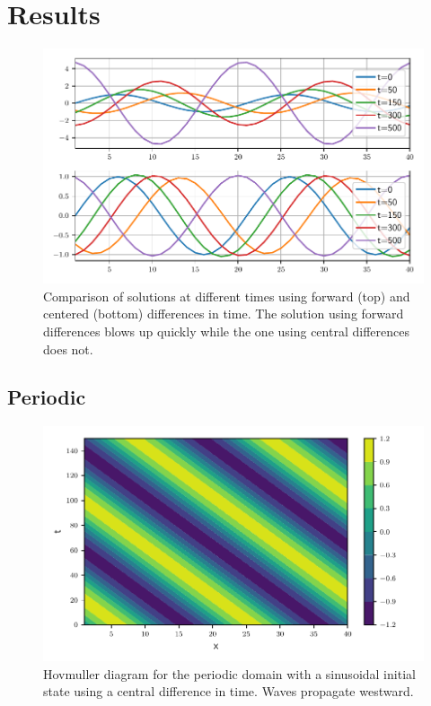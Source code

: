 \section{Results}


\begin{figure}[htp]
  \centering
  \includegraphics[width=\textwidth]{../figures/compare_dt_1.pdf}
  \caption{Comparison of solutions at different times using forward (top) and
  centered (bottom) differences in time. The solution using forward differences
  blows up quickly while the one using central differences does not.}
  \label{fig:compare}
\end{figure}


\subsection{Periodic}



\begin{figure}[htp]
  \centering
  \includegraphics[width=\textwidth]{../figures/psi_periodic_centered_short.pdf}
  \caption{Hovmuller diagram for the periodic domain with a sinusoidal initial
  state using a central difference in time. Waves propagate westward.}
  \label{fig:periodic_sine}
\end{figure}


